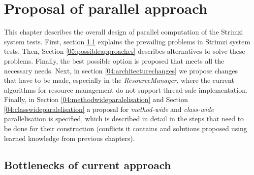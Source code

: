 \chapter{Proposal of parallel approach}

This chapter describes the overall design of parallel computation of the Strimzi system tests. First, section \ref{05:bottlenecks} explains the prevailing problems in Strimzi system tests. Then, Section \ref{05:possibleapproaches} describes alternatives to solve these problems. Finally, the best possible option is proposed that meets all the necessary needs. Next, in section \ref{04:architecturechanges} we propose changes that have to be made, especially in the \emph{ResourceManager}, where the current algorithms for resource management do not support thread-safe implementation. Finally, in Section \ref{04:methodwideparalelisation} and Section \ref{04:classwideparalelisation} a proposal for \emph{method-wide} and \emph{class-wide} parallelisation is specified, which is described in detail in the steps that need to be done for their construction (conflicts it contains and solutions proposed using learned knowledge from previous chapters).

\section{Bottlenecks of current approach}
\label{05:bottlenecks}


